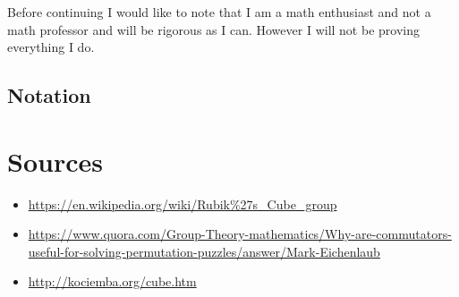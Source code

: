 \documentclass{article}
\begin{document}
Before continuing I would like to note that I am a math enthusiast and not a math professor and will be rigorous as I can. However I will not be proving everything I do.

\subsection{Notation}

\section{Sources}
\begin{itemize}
    \item \url{https://en.wikipedia.org/wiki/Rubik\%27s\_Cube\_group}
    \item \url{https://www.quora.com/Group-Theory-mathematics/Why-are-commutators-useful-for-solving-permutation-puzzles/answer/Mark-Eichenlaub}
    \item \url{http://kociemba.org/cube.htm}
\end{itemize}
\end{document}
